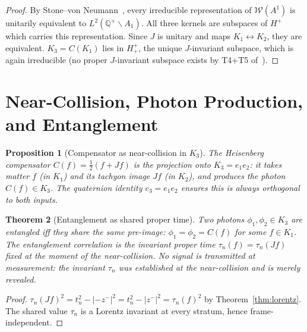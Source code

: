 \documentclass[12pt,a4paper]{article}
\newtheorem{theorem}{Theorem}[section]
\newtheorem{proposition}[theorem]{Proposition}
\newcommand{\zminus}{z^-}
\newcommand{\Hplus}{H^+}
\newcommand{\Hplusplus}{H^+_+}
\newcommand{\WA}{\mathcal{W}(A^1)}
\begin{document}
\begin{proof}
By Stone--von Neumann~\cite{brendecke2026rh}, every irreducible
representation of $\WA$ is unitarily equivalent to $L^2(\mathbb{Q}^+\backslash A_1)$.
All three kernels are subspaces of $\Hplus$ which carries this
representation.
Since $J$ is unitary and maps $K_1\leftrightarrow K_2$, they are
equivalent.
$K_3=C(K_1)$ lies in $\Hplusplus$, the unique $J$-invariant subspace,
which is again irreducible (no proper $J$-invariant subspace exists by
T4+T5 of~\cite{brendecke2026rh}).
\end{proof}


\section{Near-Collision, Photon Production, and Entanglement}
\label{sec:entanglement}

\begin{proposition}[Compensator as near-collision in $K_3$]\label{prop:compensator}
The Heisenberg compensator $C(f)=\tfrac{1}{2}(f+Jf)$ is the projection
onto $K_3=e_1 e_2$: it takes matter $f$ (in $K_1$) and its tachyon image
$Jf$ (in $K_2$), and produces the photon $C(f)\in K_3$.
The quaternion identity $e_3=e_1 e_2$ ensures this is always orthogonal
to both inputs.
\end{proposition}

\begin{theorem}[Entanglement as shared proper time]
Two photons $\phi_1,\phi_2\in K_3$ are entangled iff they share the same
pre-image: $\phi_1=\phi_2=C(f)$ for some $f\in K_1$.
The entanglement correlation is the invariant proper time
$\tau_n(f)=\tau_n(Jf)$ fixed at the moment of the near-collision.
No signal is transmitted at measurement: the invariant $\tau_n$ was
established at the near-collision and is merely revealed.
\end{theorem}

\begin{proof}
$\tau_n(Jf)^2 = t_n^2 - |-\zminus|^2 = t_n^2 - |\zminus|^2 = \tau_n(f)^2$
by Theorem~\ref{thm:lorentz}.
The shared value $\tau_n$ is a Lorentz invariant at every stratum,
hence frame-independent.
\end{proof}

\end{document}
